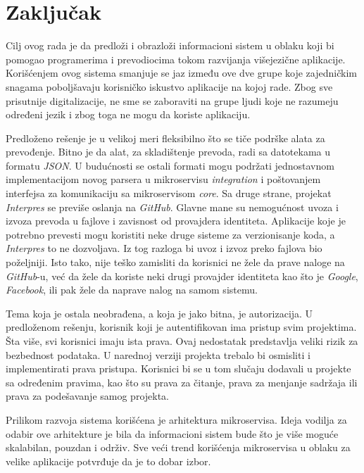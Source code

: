 \chapter{Zaključak}\label{ch:zakljucak}

Cilj ovog rada je da predloži i obrazloži informacioni sistem u oblaku koji bi pomogao 
programerima i prevodiocima tokom razvijanja višejezične aplikacije. Korišćenjem ovog 
sistema smanjuje se jaz između ove dve grupe koje zajedničkim snagama poboljšavaju 
korisničko iskustvo aplikacije na kojoj rade. Zbog sve prisutnije digitalizacije, 
ne sme se zaboraviti na grupe ljudi koje ne razumeju određeni jezik i zbog toga 
ne mogu da koriste aplikaciju.

Predloženo rešenje je u velikoj meri fleksibilno što se tiče podrške alata za prevođenje.
Bitno je da alat, za skladištenje prevoda, radi sa datotekama u formatu \textit{JSON}. 
U budućnosti se ostali formati mogu podržati jednostavnom implementacijom novog parsera
u mikroservisu \textit{integration} i poštovanjem interfejsa za komunikaciju sa 
mikroservisom \textit{core}. Sa druge strane, projekat \textit{Interpres} se previše 
oslanja na \textit{GitHub}. Glavne mane su nemogućnost uvoza i izvoza prevoda u fajlove 
i zavisnost od provajdera identiteta. Aplikacije koje je potrebno prevesti mogu koristiti 
neke druge sisteme za verzionisanje koda, a \textit{Interpres} to ne dozvoljava. Iz tog 
razloga bi uvoz i izvoz preko fajlova bio poželjniji. Isto tako, 
nije teško zamisliti da korisnici ne žele da prave naloge na \textit{GitHub}-u, već da 
žele da koriste neki drugi provajder identiteta kao što je \textit{Google},
\textit{Facebook}, ili pak žele da naprave nalog na samom sistemu.

Tema koja je ostala neobrađena, a koja je jako bitna, je autorizacija. U predloženom rešenju,
korisnik koji je autentifikovan ima pristup svim projektima. Šta više, svi korisnici imaju ista prava. 
Ovaj nedostatak predstavlja veliki rizik za bezbednost podataka. U narednoj verziji projekta trebalo bi osmisliti i 
implementirati prava pristupa. Korisnici bi se u tom slučaju dodavali u projekte sa određenim 
pravima, kao što su prava za čitanje, prava za menjanje sadržaja ili prava za podešavanje 
samog projekta.

Prilikom razvoja sistema korišćena je arhitektura mikroservisa. Ideja vodilja za odabir 
ove arhitekture je bila da informacioni sistem bude što je više moguće skalabilan, 
pouzdan i održiv. Sve veći trend korišćenja mikroservisa u oblaku za velike aplikacije 
potvrđuje da je to dobar izbor. 


